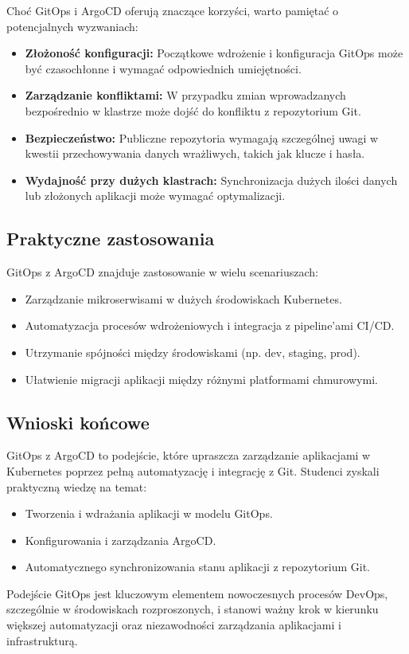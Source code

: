 \documentclass{article}
\begin{document}
Choć GitOps i ArgoCD oferują znaczące korzyści, warto pamiętać o potencjalnych wyzwaniach:
\begin{itemize}
    \item \textbf{Złożoność konfiguracji:} Początkowe wdrożenie i konfiguracja GitOps może być czasochłonne i wymagać odpowiednich umiejętności.
    \item \textbf{Zarządzanie konfliktami:} W przypadku zmian wprowadzanych bezpośrednio w klastrze może dojść do konfliktu z repozytorium Git.
    \item \textbf{Bezpieczeństwo:} Publiczne repozytoria wymagają szczególnej uwagi w kwestii przechowywania danych wrażliwych, takich jak klucze i hasła.
    \item \textbf{Wydajność przy dużych klastrach:} Synchronizacja dużych ilości danych lub złożonych aplikacji może wymagać optymalizacji.
\end{itemize}

\subsection{Praktyczne zastosowania}

GitOps z ArgoCD znajduje zastosowanie w wielu scenariuszach:
\begin{itemize}
    \item Zarządzanie mikroserwisami w dużych środowiskach Kubernetes.
    \item Automatyzacja procesów wdrożeniowych i integracja z pipeline'ami CI/CD.
    \item Utrzymanie spójności między środowiskami (np. dev, staging, prod).
    \item Ułatwienie migracji aplikacji między różnymi platformami chmurowymi.
\end{itemize}

\subsection{Wnioski końcowe}

GitOps z ArgoCD to podejście, które upraszcza zarządzanie aplikacjami w Kubernetes poprzez pełną automatyzację i integrację z Git. Studenci zyskali praktyczną wiedzę na temat:
\begin{itemize}
    \item Tworzenia i wdrażania aplikacji w modelu GitOps.
    \item Konfigurowania i zarządzania ArgoCD.
    \item Automatycznego synchronizowania stanu aplikacji z repozytorium Git.
\end{itemize}

Podejście GitOps jest kluczowym elementem nowoczesnych procesów DevOps, szczególnie w środowiskach rozproszonych, i stanowi ważny krok w kierunku większej automatyzacji oraz niezawodności zarządzania aplikacjami i infrastrukturą.
\end{document}
